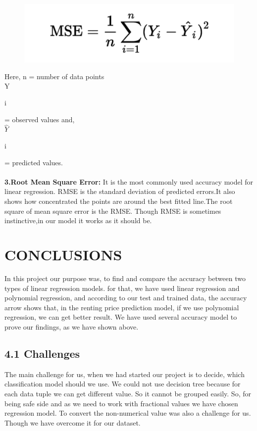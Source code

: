 \documentclass[conference]{IEEEtran}[10]
\begin{document}
\begin{figure}[H]
\centering
\includegraphics[scale=0.4]{mse}
\end{figure}
Here, n = number of data points\\
      Y\begin{footnotesize}
      i
      \end{footnotesize} = observed values and,\\
      $\widehat{Y}$\begin{footnotesize}
      i
      \end{footnotesize} = predicted values.\\
\\      
\textbf{3.Root Mean Square Error:}
It is the most commonly used accuracy model for linear regression. RMSE is the standard deviation of predicted errors.It also shows how concentrated the points are around the best fitted line.The root square of mean square error is the RMSE. Though RMSE is sometimes instinctive,in our model it works as it should be. 
\\
\section{CONCLUSIONS}
In this project our purpose was, to find and compare the accuracy between two types of linear regression models. for that, we have used linear regression and polynomial regression, and according to our test and trained data, the accuracy arrow shows that, in the renting price prediction model, if we use polynomial regression, we can get better result. We have used several accuracy model to prove our findings, as we have shown above.
\subsection{4.1 Challenges}
The main challenge for us, when we had started our project is to decide, which classification model should we use. We could not use decision tree because for each data tuple we can get different value. So it cannot be grouped easily. So, for being safe side and as we need to work with fractional values we have chosen regression model. To convert the non-numerical value was also a challenge for us. Though we have overcome it for our dataset.
\\
\end{document}
